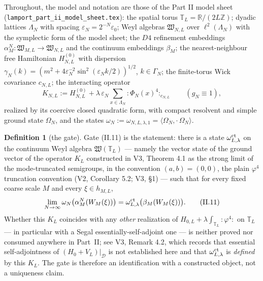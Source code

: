 \documentclass[11pt,a4paper]{article}
\theoremstyle{plain}
\theoremstyle{definition}
\newtheorem{definition}[theorem]{Definition}
\newcommand{\R}{\mathbb{R}}
\newcommand{\Z}{\mathbb{Z}}
\newcommand{\T}{\mathbb{T}}
\newcommand{\W}{\mathfrak{W}}
\newcommand{\Om}{\Omega}
\newcommand{\eps}{\varepsilon}
\newcommand{\ip}[2]{\langle #1,#2\rangle}
\begin{document}
Throughout, the model and notation are those of the Part II model sheet
(\texttt{lamport\_part\_ii\_}\allowbreak\texttt{model\_sheet.tex}): the spatial torus $\T_L=\R/(2L\Z)$;
dyadic lattices $\Lambda_N$ with spacing $\eps_N=2^{-N}\eps_0$; Weyl algebras
$\W_{N,L}$ over $\ell^2(\Lambda_N)$ with the symplectic form of the model sheet;
the $D4$ refinement embeddings $\alpha_M^N:\W_{M,L}\to\W_{N,L}$ and the continuum
embeddings $\beta_M$; the nearest-neighbour free Hamiltonian $H^{(0)}_{N,L}$ with
dispersion $\gamma_N(k)=(m^2+4\eps_N^{-2}\sin^2(\eps_Nk/2))^{1/2}$, $k\in\Gamma_N$; the
finite-torus Wick covariance $c_{N,L}$; the interacting operator
\[
 K_{N,L}:=H^{(0)}_{N,L}
 +\lambda\,\eps_N\!\!\sum_{x\in\Lambda_N}\!{:}\Phi_N(x)^4{:}_{c_{N,L}}
 \qquad(g_N\equiv1),
\]
realized by its coercive closed quadratic form, with compact resolvent and simple
ground state $\Om_{N}$, and the states
$\omega_{N}:=\omega_{N,L,\lambda,1}=\ip{\Om_N}{\cdot\,\Om_N}$.

\begin{definition}[the gate]\label{def:gate}
Gate (II.11) is the statement: there is a state $\omega^{\rm ct}_{L,\lambda}$ on the
continuum Weyl algebra $\W(\T_L)$ --- namely the vector state of the ground vector
of the operator $K_L$ constructed in V3, Theorem 4.1 as the strong limit of the
mode-truncated semigroups, in the convention $(a,b)=(0,0)$, the plain $\varphi^4$
truncation convention (V2, Corollary 5.2; V3, \S1) --- such that for every
fixed coarse scale $M$ and every $\xi\in h_{M,L}$,
\begin{equation}
 \lim_{N\to\infty}\omega_{N}\bigl(\alpha_M^N(W_M(\xi))\bigr)
 =\omega^{\rm ct}_{L,\lambda}\bigl(\beta_M(W_M(\xi))\bigr).
 \tag{II.11}\label{eq:II11}
\end{equation}
Whether this $K_L$ coincides with any \emph{other} realization of
$H_{0,L}+\lambda\int_{\T_L}{:}\varphi^4{:}$ on $\T_L$ --- in particular with a Segal
essentially-self-adjoint one --- is neither proved nor consumed anywhere in Part~II;
see V3, Remark 4.2, which records that essential self-adjointness of
$(H_0+V_L)|_{\mathcal D}$ is not established here and that $\omega^{\rm ct}_{L,\lambda}$ is
\emph{defined} by this $K_L$. The gate is therefore an identification with a
constructed object, not a uniqueness claim.
\end{definition}
\end{document}
